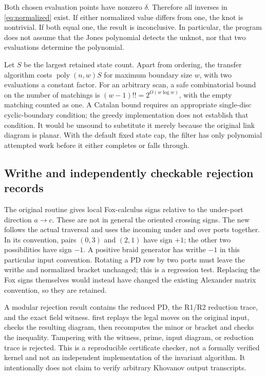 \documentclass[11pt,letterpaper]{article}
\theoremstyle{definition}\newtheorem{definition}[theorem]{Definition}
\theoremstyle{remark}\newtheorem{remark}[theorem]{Remark}
\newcommand{\poly}{\operatorname{poly}}
\newcommand{\code}[1]{\texttt{\detokenize{#1}}}
\begin{document}
Both chosen evaluation points have nonzero $\delta$. Therefore all inverses in
\eqref{eq:normalized} exist. If either normalized value differs from one, the
knot is nontrivial. If both equal one, the result is inconclusive. In particular,
the program does not assume that the Jones polynomial detects the unknot, nor
that two evaluations determine the polynomial.

Let $S$ be the largest retained state count. Apart from ordering, the transfer
algorithm costs $\poly(n,w)S$ for maximum boundary size $w$, with two evaluations
a constant factor. For an arbitrary scan, a safe combinatorial bound on the
number of matchings is $(w-1)!!=2^{O(w\log w)}$, with the empty matching counted
as one. A Catalan bound requires an appropriate single-disc cyclic-boundary
condition; the greedy implementation does not establish that condition. It
would be unsound to substitute it merely because the original link diagram is
planar. With the default fixed state cap, the filter has only polynomial
attempted work before it either completes or falls through.

\subsection{Writhe and independently checkable rejection records}

The original \code{signs()} routine gives local Fox-calculus signs relative to
the under-port direction $a\to c$. These are not in general the oriented
crossing signs. The new \code{writhe()} follows the actual traversal and uses the
incoming under and over ports together. In its convention, pairs $(0,3)$ and
$(2,1)$ have sign $+1$; the other two possibilities have sign $-1$. A positive
braid generator has writhe $-1$ in this particular input convention. Rotating a
PD row by two ports must leave the writhe and normalized bracket unchanged; this
is a regression test. Replacing the Fox signs themselves would instead have
changed the existing Alexander matrix convention, so they are retained.

A modular rejection result contains the reduced PD, the R1/R2 reduction trace,
and the exact field witness. \code{verify_rejection} first replays the legal
moves on the original input, checks the resulting diagram, then recomputes the
minor or bracket and checks the inequality. Tampering with the witness, prime,
input diagram, or reduction trace is rejected. This is a reproducible certificate
checker, not a formally verified kernel and not an independent implementation
of the invariant algorithm. It intentionally does not claim to verify arbitrary
Khovanov output transcripts.
\end{document}
